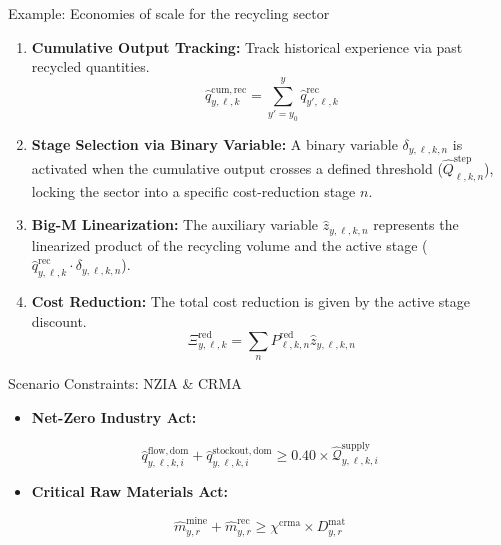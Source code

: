 \documentclass[10pt]{beamer}
\begin{document}
\begin{frame}{Example: Economies of scale for the recycling sector}
    
    \begin{enumerate}
        \item \textbf{Cumulative Output Tracking:} Track historical experience via past recycled quantities.
        \[ \hat{q}^{\mathrm{cum,rec}}_{y,\ell,k} = \sum_{y'=y_0}^{y} \hat{q}^{\mathrm{rec}}_{y',\ell,k} \]
        
        \item \textbf{Stage Selection via Binary Variable:} A binary variable $\delta_{y,\ell,k,n}$ is activated when the cumulative output crosses a defined threshold ($\hat{Q}^{\mathrm{step}}_{\ell,k,n}$), locking the sector into a specific cost-reduction stage $n$.
        
        \item \textbf{Big-M Linearization:} The auxiliary variable $\hat{z}_{y,\ell,k,n}$ represents the linearized product of the recycling volume and the active stage ($\hat{q}^{\mathrm{rec}}_{y,\ell,k} \cdot \delta_{y,\ell,k,n}$).
        
        \item \textbf{Cost Reduction:} The total cost reduction is given by the active stage discount.
        \[ \Xi^{\mathrm{red}}_{y,\ell,k} = \sum_{n} P^{\mathrm{red}}_{\ell,k,n} \hat{z}_{y,\ell,k,n} \]
    \end{enumerate}
\end{frame}

\begin{frame}{Scenario Constraints: NZIA \& CRMA}
    \begin{itemize}
        \item \textcolor{metublue}{\textbf{Net-Zero Industry Act:}}
    \end{itemize}

    \begin{equation}
    \hat{q}^{\mathrm{flow,dom}}_{y,\ell,k,i} + \hat{q}^{\mathrm{stockout,dom}}_{y,\ell,k,i} \geq 0.40 \times \hat{\mathcal{Q}}^{\mathrm{supply}}_{y,\ell,k,i}
    \label{eq:nzia-constraint}
    \end{equation}

    \vspace{0.5cm}

    \begin{itemize}
        \item \textcolor{metublue}{\textbf{Critical Raw Materials Act:}} %
    \end{itemize}

    \begin{equation}
    \hat{m}^{\mathrm{mine}}_{y,r} + \hat{m}^{\mathrm{rec}}_{y,r} \geq \chi^{\mathrm{crma}} \times D^{\mathrm{mat}}_{y,r}
    \label{eq:crma-constraint}
    \end{equation}
\end{frame}
\end{document}
